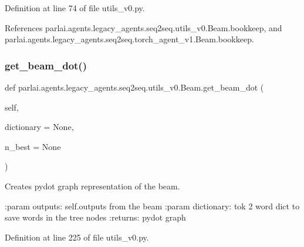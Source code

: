 Definition at line 74 of file utils\+\_\+v0.\+py.



References parlai.\+agents.\+legacy\+\_\+agents.\+seq2seq.\+utils\+\_\+v0.\+Beam.\+bookkeep, and parlai.\+agents.\+legacy\+\_\+agents.\+seq2seq.\+torch\+\_\+agent\+\_\+v1.\+Beam.\+bookkeep.

\mbox{\label{classparlai_1_1agents_1_1legacy__agents_1_1seq2seq_1_1utils__v0_1_1Beam_a0f15f5dc35437659d1ab17d4508d3abe}} 
\subsubsection{\texorpdfstring{get\+\_\+beam\+\_\+dot()}{get\_beam\_dot()}}
{\footnotesize\ttfamily def parlai.\+agents.\+legacy\+\_\+agents.\+seq2seq.\+utils\+\_\+v0.\+Beam.\+get\+\_\+beam\+\_\+dot (\begin{DoxyParamCaption}\item[{}]{self,  }\item[{}]{dictionary = {\ttfamily None},  }\item[{}]{n\+\_\+best = {\ttfamily None} }\end{DoxyParamCaption})}

\begin{DoxyVerb}Creates pydot graph representation of the beam.

:param outputs: self.outputs from the beam
:param dictionary: tok 2 word dict to save words in the tree nodes
:returns: pydot graph
\end{DoxyVerb}
 

Definition at line 225 of file utils\+\_\+v0.\+py.



